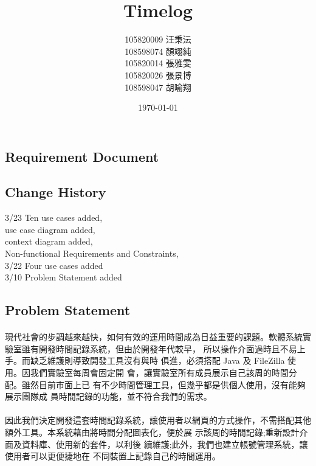 \documentclass[12pt, a4paper]{article}
\title{Timelog}
\author{105820009 汪秉沄\\
108598074 顏翊純\\
105820014 張雅雯\\
105820026 張景博\\
108598047 胡喻翔}
\date{\today}
\begin{document}
\begin{CJK*}{UTF8}{bkai}
\maketitle
\newpage

\tableofcontents
\newpage


\section{Requirement Document}
  \subsection{Change History}
  3/23 Ten use cases added,\\
    \indent use case diagram added,\\
    \indent context diagram added,\\
    \indent Non-functional Requirements and Constraints,\\
  3/22 Four use cases added\\
  3/10 Problem Statement added

  \subsection{Problem Statement}
  \paragraph{}
  現代社會的步調越來越快，如何有效的運用時間成為日益重要的課題。軟體系統實驗室雖有開發時間記錄系統，但由於開發年代較早， 所以操作介面過時且不易上手。而缺乏維護則導致開發工具沒有與時 俱進，必須搭配 Java 及 FileZilla 使用。因我們實驗室每周會固定開 會，讓實驗室所有成員展示自己該周的時間分配。雖然目前市面上已 有不少時間管理工具，但幾乎都是供個人使用，沒有能夠展示團隊成 員時間記錄的功能，並不符合我們的需求。
  \paragraph{}
  因此我們決定開發這套時間記錄系統，讓使用者以網頁的方式操作，不需搭配其他額外工具。本系統藉由將時間分配圖表化，便於展 示該周的時間記錄;重新設計介面及資料庫、使用新的套件，以利後 續維護;此外，我們也建立帳號管理系統，讓使用者可以更便捷地在 不同裝置上記錄自己的時間運用。
  \newpage


\end{CJK*}
\end{document}
